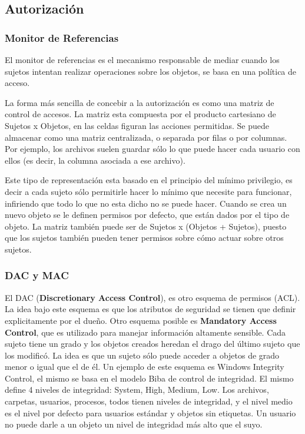 \documentclass{article}
\begin{document}
\subsection{Autorización}

\subsubsection{Monitor de Referencias}

El monitor de referencias es el mecanismo responsable de mediar cuando los sujetos intentan realizar operaciones sobre los objetos, se basa en una política de acceso.

La forma más sencilla de concebir a la autorización es como una matriz de control de accesos. La matriz esta compuesta por el producto cartesiano de Sujetos x Objetos, en las celdas figuran las acciones permitidas. Se puede almacenar como una matriz centralizada, o separada por filas o por columnas. Por ejemplo, los archivos suelen guardar sólo lo que puede hacer cada usuario con ellos (es decir, la columna asociada a ese archivo).

Este tipo de representación esta basado en el principio del mínimo privilegio, es decir a cada sujeto sólo permitirle hacer lo mínimo que necesite para funcionar, infiriendo que todo lo que no esta dicho no se puede hacer. Cuando se crea un nuevo objeto se le definen permisos por defecto, que están dados por el tipo de objeto. La matriz también puede ser de Sujetos x (Objetos + Sujetos), puesto que los sujetos también pueden tener permisos sobre cómo actuar sobre otros sujetos.

\subsubsection{DAC y MAC}

El DAC (\textbf{Discretionary Access Control}), es otro esquema de permisos (ACL). La idea bajo este esquema es que los atributos de seguridad se tienen que definir explicitamente por el dueño. Otro esquema posible es \textbf{Mandatory Access Control}, que es utilizado para manejar información altamente sensible. Cada sujeto tiene un grado y los objetos creados heredan el drago del último sujeto que los modificó. La idea es que un sujeto sólo puede acceder a objetos de grado menor o igual que el de él. Un ejemplo de este esquema es Windows Integrity Control, el mismo se basa en el modelo Biba de control de integridad. El mismo define 4 niveles de integridad: System, High, Medium, Low. Los archivos, carpetas, usuarios, procesos, todos tienen niveles de integridad, y el nivel medio es el nivel por defecto para usuarios estándar y objetos sin etiquetas. Un usuario no puede darle a un objeto un nivel de integridad más alto que el suyo.
\end{document}
